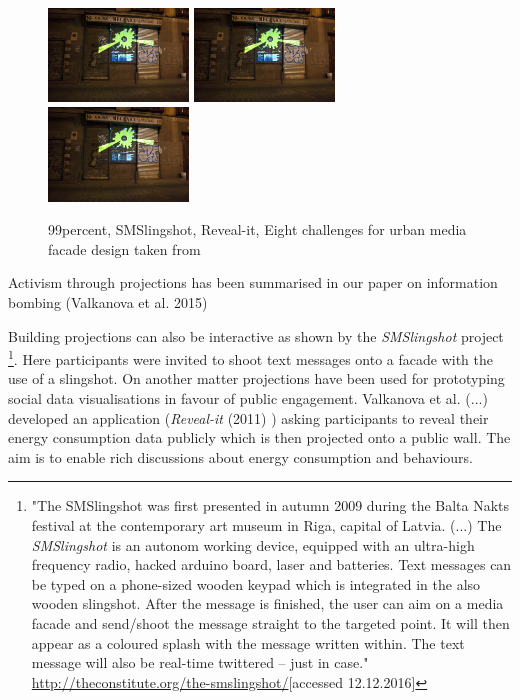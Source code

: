 \begin{figure}[htp]
\centering
\includegraphics[height=2.5cm]{Illustrations/revealit.jpg}
\includegraphics[height=2.5cm]{Illustrations/revealit.jpg}
\includegraphics[height=2.5cm]{Illustrations/revealit.jpg}
\caption[Eight challenges for urban media facade design]{99percent, SMSlingshot, Reveal-it, Eight challenges for urban media facade design taken from }
\label{8challenges}
\end{figure}

Activism through projections has been summarised in our paper on information bombing (Valkanova et al. 2015) 

Building projections can also be interactive as shown by the \textit{SMSlingshot}  project \footnote{"The SMSlingshot was first presented in autumn 2009 during the Balta Nakts festival at the contemporary art museum in Riga, capital of Latvia. (...) The \textit{SMSlingshot} is an autonom working device, equipped with an ultra-high frequency radio, hacked arduino board, laser and batteries. Text messages can be typed on a phone-sized wooden keypad which is integrated in the also wooden slingshot. After the message is finished, the user can aim on a media facade and send/shoot the message straight to the targeted point. It will then appear as a coloured splash with the message written within. The text message will also be real-time twittered – just in case." \url{http://theconstitute.org/the-smslingshot/}[accessed 12.12.2016]}. Here participants were invited to shoot text messages onto a facade with the use of a slingshot.  
On another matter projections have been used for prototyping social data visualisations in favour of public engagement. Valkanova et al. (...) developed an application (\textit{Reveal-it} (2011) ) asking participants to reveal their energy consumption data publicly which is then projected onto a public wall. The aim is to enable rich discussions about energy consumption and behaviours.  


